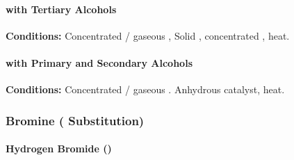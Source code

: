 				\paragraph{ with Tertiary Alcohols}

				\vspace{1.5em}
				\vbox{\textbf{Conditions:}	\tabto{35mm}Concentrated  / gaseous , 
											\tabto{35mm}Solid , concentrated , heat.}





				\pagebreak
				\paragraph{ with Primary and Secondary Alcohols}

				\vspace{1.5em}
				\vbox{\textbf{Conditions:}	\tabto{35mm}Concentrated  / gaseous .
											\tabto{35mm}Anhydrous  catalyst, heat.}






			\subsubsection{Bromine ( Substitution)}


				\paragraph{Hydrogen Bromide ()}

